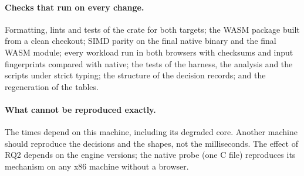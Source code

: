 \paragraph{Checks that run on every change.} Formatting, lints and tests of
the crate for both targets; the WASM package built from a clean checkout;
SIMD parity on the final native binary and the final WASM module; every
workload run in both browsers with checksums and input fingerprints
compared with native; the tests of the harness, the analysis and the
scripts under strict typing; the structure of the decision records; and
the regeneration of the tables.

\paragraph{What cannot be reproduced exactly.} The times depend on this
machine, including its degraded core. Another machine should reproduce the
decisions and the shapes, not the milliseconds. The effect of RQ2 depends
on the engine versions; the native probe (one C file) reproduces its
mechanism on any x86 machine without a browser.
